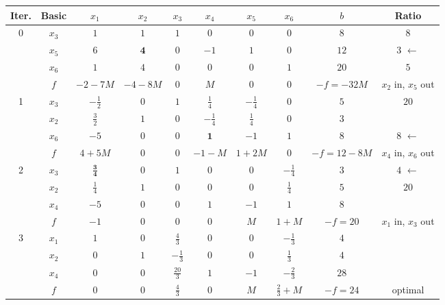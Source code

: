 \documentclass[11pt,a4paper]{article}
\begin{document}
\begin{center}\renewcommand{\arraystretch}{1.35}\setlength{\tabcolsep}{4.5pt}\small
\begin{tabular}{|c|c|cccccc|c|c|}
\hline
\rowcolor{headgray}\textbf{Iter.} & \textbf{Basic} & $x_{1}$ & $x_{2}$ & $x_{3}$ & $x_{4}$ & $x_{5}$ & $x_{6}$ & $b$ & \textbf{Ratio} \\ \hline
\multirow{4}{*}{0} & $x_{3}$ & $1$ & $1$ & $1$ & $0$ & $0$ & $0$ & $8$ & $8$ \\
 & $x_{5}$ & $6$ & \cellcolor{pivot}$\mathbf{4}$ & $0$ & $-1$ & $1$ & $0$ & $12$ & $3$ $\leftarrow$ \\
 & $x_{6}$ & $1$ & $4$ & $0$ & $0$ & $0$ & $1$ & $20$ & $5$ \\
\cline{2-10}
 & $f$ & $-2-7M$ & $-4-8M$ & $0$ & $M$ & $0$ & $0$ & $-f=-32M$ & $x_{2}$ in, $x_{5}$ out \\ \hline
\multirow{4}{*}{1} & $x_{3}$ & $-\tfrac{1}{2}$ & $0$ & $1$ & $\tfrac{1}{4}$ & $-\tfrac{1}{4}$ & $0$ & $5$ & $20$ \\
 & $x_{2}$ & $\tfrac{3}{2}$ & $1$ & $0$ & $-\tfrac{1}{4}$ & $\tfrac{1}{4}$ & $0$ & $3$ &  \\
 & $x_{6}$ & $-5$ & $0$ & $0$ & \cellcolor{pivot}$\mathbf{1}$ & $-1$ & $1$ & $8$ & $8$ $\leftarrow$ \\
\cline{2-10}
 & $f$ & $4+5M$ & $0$ & $0$ & $-1-M$ & $1+2M$ & $0$ & $-f=12-8M$ & $x_{4}$ in, $x_{6}$ out \\ \hline
\multirow{4}{*}{2} & $x_{3}$ & \cellcolor{pivot}$\mathbf{\tfrac{3}{4}}$ & $0$ & $1$ & $0$ & $0$ & $-\tfrac{1}{4}$ & $3$ & $4$ $\leftarrow$ \\
 & $x_{2}$ & $\tfrac{1}{4}$ & $1$ & $0$ & $0$ & $0$ & $\tfrac{1}{4}$ & $5$ & $20$ \\
 & $x_{4}$ & $-5$ & $0$ & $0$ & $1$ & $-1$ & $1$ & $8$ &  \\
\cline{2-10}
 & $f$ & $-1$ & $0$ & $0$ & $0$ & $M$ & $1+M$ & $-f=20$ & $x_{1}$ in, $x_{3}$ out \\ \hline
\multirow{4}{*}{3} & $x_{1}$ & $1$ & $0$ & $\tfrac{4}{3}$ & $0$ & $0$ & $-\tfrac{1}{3}$ & $4$ &  \\
 & $x_{2}$ & $0$ & $1$ & $-\tfrac{1}{3}$ & $0$ & $0$ & $\tfrac{1}{3}$ & $4$ &  \\
 & $x_{4}$ & $0$ & $0$ & $\tfrac{20}{3}$ & $1$ & $-1$ & $-\tfrac{2}{3}$ & $28$ &  \\
\cline{2-10}
 & $f$ & $0$ & $0$ & $\tfrac{4}{3}$ & $0$ & $M$ & $\tfrac{2}{3}+M$ & $-f=24$ & optimal \\ \hline
\end{tabular}\end{center}
\end{document}
